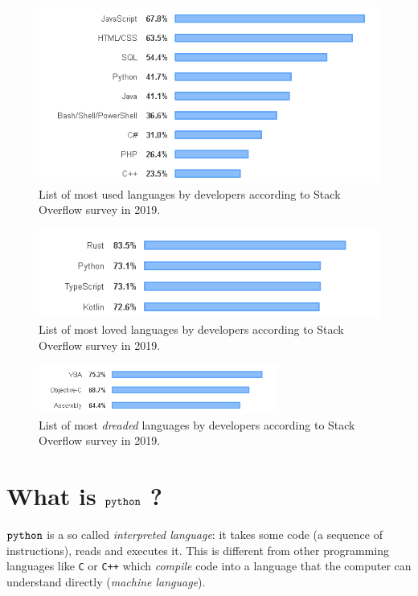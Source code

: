 \begin{center}
  \begin{figure}
    \includegraphics[width=0.7\linewidth]{figures/most_used}
    \caption{List of most used languages by developers according to Stack Overflow survey in 2019.}
  \end{figure}
  \begin{figure}
    \includegraphics[width=0.7\linewidth]{figures/most_loved}
    \caption{List of most loved languages by developers according to Stack Overflow survey in 2019.}
  \end{figure}
  \begin{figure}
    \includegraphics[width=0.7\textwidth]{figures/most_dreaded}
    \caption{List of most \emph{dreaded} languages by developers according to Stack Overflow survey in 2019.}
  \end{figure}
\end{center}

\section{What is $\tt{python}$ ?}\label{what-is-python}

$\tt{python}$ is a so called \emph{interpreted language}: it takes some code (a sequence of instructions), reads and executes it. This is different from other programming languages like \texttt{C} or \texttt{C++} which \emph{compile} code into a language that the computer can understand directly (\emph{machine language}).

